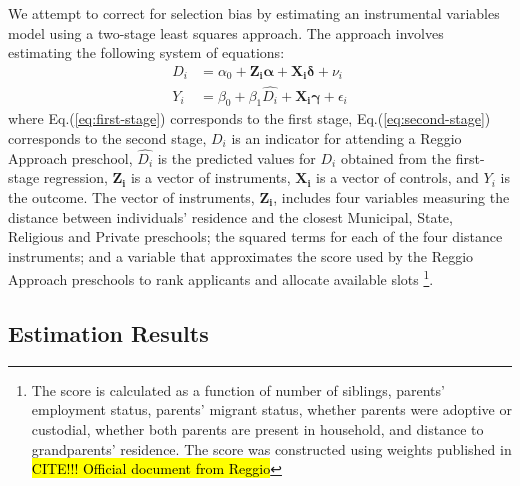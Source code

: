 We attempt to correct for selection bias by estimating an instrumental variables model using a two-stage least squares approach. The approach involves estimating the following system of equations:
\begin{align}
D_i &= \alpha_0 + \bm{Z_i \alpha} + \bm{X_i \delta} + \nu_i \label{eq:first-stage}\\
Y_i &= \beta_0 + \beta_1 \hat{D_i} + \bm{X_i \gamma} + \epsilon_i \label{eq:second-stage}
\end{align}
where Eq.(\ref{eq:first-stage}) corresponds to the first stage, Eq.(\ref{eq:second-stage}) corresponds to the second stage, $D_i$ is an indicator for attending a Reggio Approach preschool, $\hat{D_i}$ is the predicted values for $D_i$ obtained from the first-stage regression, $\bm{Z_i}$ is a vector of instruments, $\bm{X_i}$ is a vector of controls, and $Y_i$ is the outcome. The vector of instruments, $\bm{Z_i}$, includes four variables measuring the distance between individuals' residence and the closest Municipal, State, Religious and Private preschools; the squared terms for each of the four distance instruments; and a variable that approximates the score used by the Reggio Approach preschools to rank applicants and allocate available slots \footnote{The score is calculated as a function of number of siblings, parents' employment status, parents' migrant status, whether parents were adoptive or custodial, whether both parents are present in household, and distance to grandparents' residence. The score was constructed using weights published in \hl{CITE!!! Official document from Reggio}}.
\subsection{Estimation Results}\label{appendix:iv}
